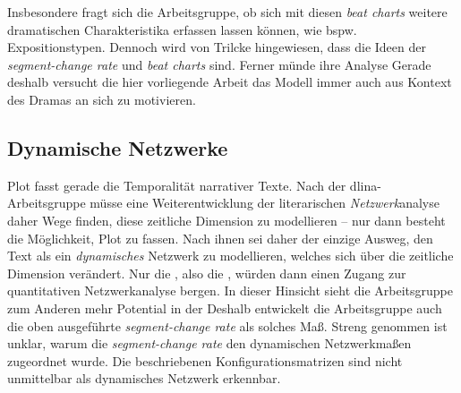 \documentclass[a4paper,10pt,abstract=true,headings=small]{scrartcl}
\begin{document}
Insbesondere fragt sich die Arbeitsgruppe, ob sich mit diesen \emph{beat charts} weitere dramatischen Charakteristika erfassen lassen können, wie bspw. Expositionstypen.
Dennoch wird von Trilcke hingewiesen, dass die Ideen der \emph{segment-change rate} und \emph{beat charts}  sind.
Ferner münde ihre Analyse 
Gerade deshalb versucht die hier vorliegende Arbeit das Modell immer auch aus Kontext des Dramas an sich zu motivieren.




\subsection{Dynamische Netzwerke}

Plot fasst gerade die Temporalität narrativer Texte.
Nach der dlina-Arbeitsgruppe müsse eine Weiterentwicklung der literarischen \emph{Netzwerk}analyse daher Wege finden, diese zeitliche Dimension zu modellieren – nur dann besteht die Möglichkeit, Plot zu fassen. %
Nach ihnen sei daher der einzige Ausweg, den Text als ein \emph{dynamisches} Netzwerk zu modellieren, welches sich über die zeitliche Dimension verändert.
Nur die , also die , würden dann einen Zugang zur quantitativen Netzwerkanalyse bergen.\autocite[Vgl.][176]{trilcke_netzwerkdynamik_2017}
In dieser Hinsicht sieht die Arbeitsgruppe zum Anderen mehr Potential in der \autocites[178]{trilcke_netzwerkdynamik_2017}[Vgl. auch][438]{fischer_network_2017}
Deshalb entwickelt die Arbeitsgruppe auch die oben ausgeführte \emph{segment-change rate} als solches Maß.\autocite[Vgl.][437]{fischer_network_2017}
Streng genommen ist unklar, warum die \emph{segment-change rate} den dynamischen Netzwerkmaßen zugeordnet wurde.
Die beschriebenen Konfigurationsmatrizen sind nicht unmittelbar als dynamisches Netzwerk erkennbar.
\end{document}
